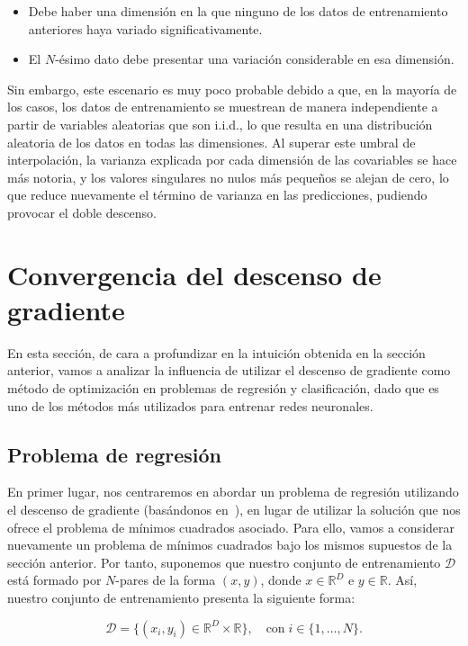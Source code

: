 \begin{itemize}
    \item Debe haber una dimensión en la que ninguno de los datos de entrenamiento anteriores haya variado significativamente.
    \item El $N$-ésimo dato debe presentar una variación considerable en esa dimensión.
\end{itemize}

Sin embargo, este escenario es muy poco probable debido a que, en la mayoría de los casos, los datos de entrenamiento se muestrean de manera independiente a partir de variables aleatorias que son i.i.d., lo que resulta en una distribución aleatoria de los datos en todas las dimensiones. Al superar este umbral de interpolación, la varianza explicada por cada dimensión de las covariables se hace más notoria, y los valores singulares no nulos más pequeños se alejan de cero, lo que reduce nuevamente el término de varianza en las predicciones, pudiendo provocar el doble descenso.

\section{Convergencia del descenso de gradiente}\label{sec:sesgo-implicito-descenso-gradiente}

En esta sección, de cara a profundizar en la intuición obtenida en la sección anterior, vamos a analizar la influencia de utilizar el descenso de gradiente como método de optimización en problemas de regresión y clasificación, dado que es uno de los métodos más utilizados para entrenar redes neuronales.

\subsection{Problema de regresión}\label{subsec:problema-regresion}
En primer lugar, nos centraremos en abordar un problema de regresión utilizando el descenso de gradiente (basándonos en~\cite{Lafon2024}), en lugar de utilizar la solución que nos ofrece el problema de mínimos cuadrados asociado. Para ello, vamos a considerar nuevamente un problema de mínimos cuadrados bajo los mismos supuestos de la sección anterior. Por tanto, suponemos que nuestro conjunto de entrenamiento $\mathcal{D}$ está formado por $N$-pares de la forma $(x, y)$, donde $x \in \mathbb{R}^{D}$ e $y \in \mathbb{R}$. Así, nuestro conjunto de entrenamiento presenta la siguiente forma:

\[
    \mathcal{D} = \{ (x_i, y_i) \in \mathbb{R}^{D} \times \mathbb{R} \}, \quad \text{con} \; i \in \{ 1, \ldots, N \}.
\]

